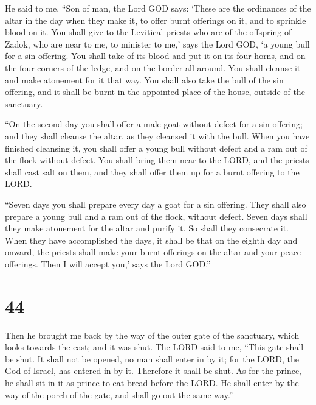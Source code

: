  He said to me, ``Son of man, the Lord GOD says: `These are
the ordinances of the altar in the day when they make it, to offer burnt
offerings on it, and to sprinkle blood on it.  You shall
give to the Levitical priests who are of the offspring of Zadok, who are
near to me, to minister to me,' says the Lord GOD, `a young bull for a
sin offering.  You shall take of its blood and put it on
its four horns, and on the four corners of the ledge, and on the border
all around. You shall cleanse it and make atonement for it that way.
 You shall also take the bull of the sin offering, and it
shall be burnt in the appointed place of the house, outside of the
sanctuary.

 ``On the second day you shall offer a male goat without
defect for a sin offering; and they shall cleanse the altar, as they
cleansed it with the bull.  When you have finished
cleansing it, you shall offer a young bull without defect and a ram out
of the flock without defect.  You shall bring them near to
the LORD, and the priests shall cast salt on them, and they shall offer
them up for a burnt offering to the LORD.

 ``Seven days you shall prepare every day a goat for a sin
offering. They shall also prepare a young bull and a ram out of the
flock, without defect.  Seven days shall they make
atonement for the altar and purify it. So shall they consecrate it.
 When they have accomplished the days, it shall be that on
the eighth day and onward, the priests shall make your burnt offerings
on the altar and your peace offerings. Then I will accept you,' says the
Lord GOD.''

\hypertarget{section-42}{%
\section{44}\label{section-42}}

 Then he brought me back by the way of the outer gate of the
sanctuary, which looks towards the east; and it was shut. 
The LORD said to me, ``This gate shall be shut. It shall not be opened,
no man shall enter in by it; for the LORD, the God of Israel, has
entered in by it. Therefore it shall be shut.  As for the
prince, he shall sit in it as prince to eat bread before the LORD. He
shall enter by the way of the porch of the gate, and shall go out the
same way.''

